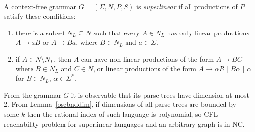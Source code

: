 \begin{example}
\\
A context-free grammar $G = (\Sigma, N, P, S)$ is \textit{superlinear} if all productions of $P$ satisfy these conditions:
\begin{enumerate}
\item there is a subset $N_L \subseteq N$ such that every $A \in N_L$ has only linear productions $A\rightarrow aB$ or $A\rightarrow Ba$, where $B \in N_L$ and $a \in \Sigma$.
\item if $A \in N \setminus N_L$, then $A$ can have non-linear productions of the form $A \rightarrow BC$ where $B\in N_L$ and $C \in N$, or linear productions of the form $A\rightarrow \alpha B$ | $B \alpha$ | $\alpha$ for $B \in N_L$, $\alpha \in \Sigma^*$.
\end{enumerate}
From the grammar $G$ it is observable that its parse trees have dimension at most 2. From 
Lemma~\ref{oscbnddim}, if dimensions of all parse trees are bounded by some $k$ then the rational index of such language is polynomial, so CFL-reachability problem for superlinear languages and an arbitrary graph is in NC. 
\end{example}
